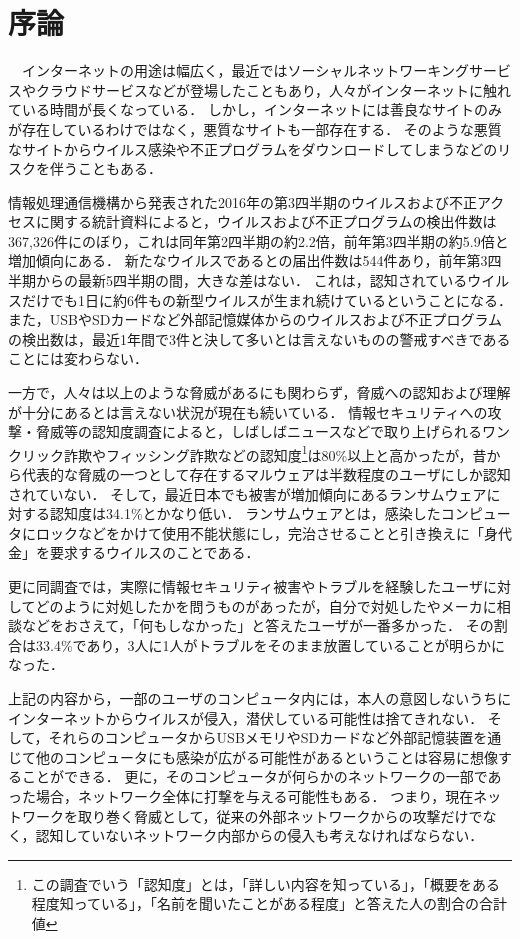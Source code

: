 \chapter{序論}

　インターネットの用途は幅広く，最近ではソーシャルネットワーキングサービスやクラウドサービスなどが登場したこともあり，人々がインターネットに触れている時間が長くなっている．
しかし，インターネットには善良なサイトのみが存在しているわけではなく，悪質なサイトも一部存在する．
そのような悪質なサイトからウイルス感染や不正プログラムをダウンロードしてしまうなどのリスクを伴うこともある．

情報処理通信機構から発表された2016年の第3四半期のウイルスおよび不正アクセスに関する統計資料\cite{joron2}によると，ウイルスおよび不正プログラムの検出件数は367,326件にのぼり，これは同年第2四半期の約2.2倍，前年第3四半期の約5.9倍と増加傾向にある．
新たなウイルスであるとの届出件数は544件あり，前年第3四半期からの最新5四半期の間，大きな差はない．
これは，認知されているウイルスだけでも1日に約6件もの新型ウイルスが生まれ続けているということになる．
また，USBやSDカードなど外部記憶媒体からのウイルスおよび不正プログラムの検出数は，最近1年間で3件と決して多いとは言えないものの警戒すべきであることには変わらない．

一方で，人々は以上のような脅威があるにも関わらず，脅威への認知および理解が十分にあるとは言えない状況が現在も続いている．
情報セキュリティへの攻撃・脅威等の認知度調査\cite{joron1}によると，しばしばニュースなどで取り上げられるワンクリック詐欺やフィッシング詐欺などの認知度\footnote{この調査でいう「認知度」とは，「詳しい内容を知っている」，「概要をある程度知っている」，「名前を聞いたことがある程度」と答えた人の割合の合計値}は80\%以上と高かったが，昔から代表的な脅威の一つとして存在するマルウェアは半数程度のユーザにしか認知されていない．
そして，最近日本でも被害が増加傾向にあるランサムウェア\cite{ransomware}に対する認知度は34.1\%とかなり低い．
ランサムウェアとは，感染したコンピュータにロックなどをかけて使用不能状態にし，完治させることと引き換えに「身代金」を要求するウイルスのことである．

更に同調査では，実際に情報セキュリティ被害やトラブルを経験したユーザに対してどのように対処したかを問うものがあったが，自分で対処したやメーカに相談などをおさえて，「何もしなかった」と答えたユーザが一番多かった．
その割合は33.4\%であり，3人に1人がトラブルをそのまま放置していることが明らかになった．

上記の内容から，一部のユーザのコンピュータ内には，本人の意図しないうちにインターネットからウイルスが侵入，潜伏している可能性は捨てきれない．
そして，それらのコンピュータからUSBメモリやSDカードなど外部記憶装置を通じて他のコンピュータにも感染が広がる可能性があるということは容易に想像することができる．
更に，そのコンピュータが何らかのネットワークの一部であった場合，ネットワーク全体に打撃を与える可能性もある．
つまり，現在ネットワークを取り巻く脅威として，従来の外部ネットワークからの攻撃だけでなく，認知していないネットワーク内部からの侵入も考えなければならない．

